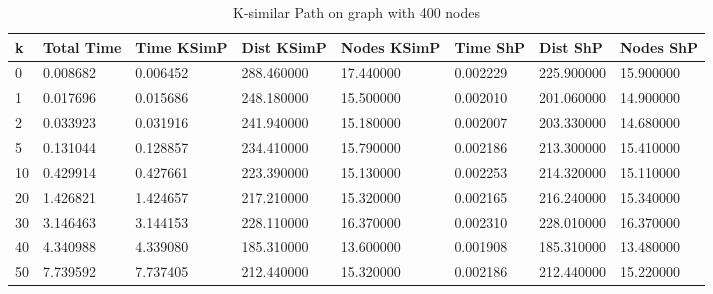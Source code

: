 \documentclass[]{article}
\numberwithin{equation}{section}
\begin{document}
\begin{appendices}
\begin{table}[H]
	\centering
	\small
	\setlength\tabcolsep{2pt}
	\begin{tabular}{|l|l|l|l|l|l|l|l|}
		\hline
		k  & Total Time & Time KSimP & Dist KSimP & Nodes KSimP & Time ShP & Dist ShP   & Nodes ShP \\ \hline
		0  & 0.008682   & 0.006452   & 288.460000 & 17.440000   & 0.002229 & 225.900000 & 15.900000 \\ \hline
		1  & 0.017696   & 0.015686   & 248.180000 & 15.500000   & 0.002010 & 201.060000 & 14.900000 \\ \hline
		2  & 0.033923   & 0.031916   & 241.940000 & 15.180000   & 0.002007 & 203.330000 & 14.680000 \\ \hline
		5  & 0.131044   & 0.128857   & 234.410000 & 15.790000   & 0.002186 & 213.300000 & 15.410000 \\ \hline
		10 & 0.429914   & 0.427661   & 223.390000 & 15.130000   & 0.002253 & 214.320000 & 15.110000 \\ \hline
		20 & 1.426821   & 1.424657   & 217.210000 & 15.320000   & 0.002165 & 216.240000 & 15.340000 \\ \hline
		30 & 3.146463   & 3.144153   & 228.110000 & 16.370000   & 0.002310 & 228.010000 & 16.370000 \\ \hline
		40 & 4.340988   & 4.339080   & 185.310000 & 13.600000   & 0.001908 & 185.310000 & 13.480000 \\ \hline
		50 & 7.739592   & 7.737405   & 212.440000 & 15.320000   & 0.002186 & 212.440000 & 15.220000 \\ \hline
	\end{tabular}
	\caption{K-similar Path on graph with 400 nodes}
\end{table}


\end{appendices}
\end{document}
